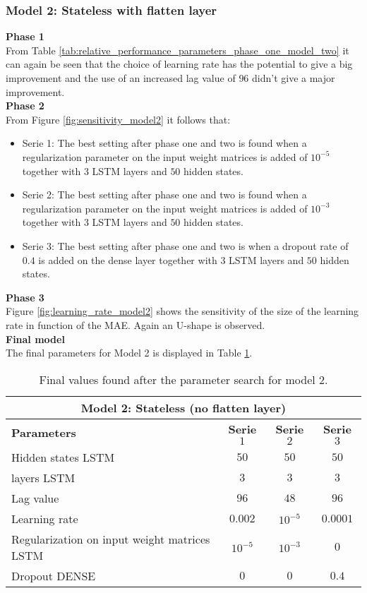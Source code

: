 \clearpage
\subsubsection{Model 2: Stateless with flatten layer}

\textbf{Phase 1}\\
From Table \ref{tab:relative_performance_parameters_phase_one_model_two} it can again be seen that the choice of learning rate has the potential to give a big improvement and the use of an increased lag value of $ 96 $ didn't give a major improvement.\\ 

\textbf{Phase 2}\\
From Figure \ref{fig:sensitivity_model2} it follows that:
\begin{itemize}
	\item Serie 1: The best setting after phase one and two is found when a regularization parameter on the input weight matrices is added of $ 10^{-5} $ together with $ 3 $ LSTM layers and $ 50 $ hidden states. 
	\item Serie 2: The best setting after phase one and two is found when a regularization parameter on the input weight matrices is added of $ 10^{-3} $ together with $ 3 $ LSTM layers and $ 50 $ hidden states.
	\item Serie 3: The best setting after phase one and two is when a dropout rate of $ 0.4 $ is added on the dense layer together with $ 3 $ LSTM layers and $ 50 $ hidden states.
\end{itemize}

\textbf{Phase 3}\\
Figure \ref{fig:learning_rate_model2} shows the sensitivity of the size of the learning rate in function of the MAE. Again an U-shape is observed.\\

\textbf{Final model}\\
The final parameters for Model 2 is displayed in Table \ref{tab:final_model2}.

\begin{table}[h]
	\centering
	\begin{tabular}{@{}l|ccc@{}} \toprule
		\multicolumn{4}{c}{Model 2: Stateless (no flatten layer)}\\\midrule\midrule
		\textbf{Parameters}	& \textbf{Serie $ 1 $} & \textbf{Serie $ 2 $} & \textbf{Serie $ 3 $}\\\midrule
		Hidden states LSTM & $50 $&$ 50 $  & $50 $\\
		layers LSTM & $3 $&$ 3 $  & $3$\\
		Lag value & $96 $&$ 48$  & $96$\\
		Learning rate & $0.002 $&$ 10^{-5}$  & $0.0001$\\\hline
		Regularization on input weight matrices LSTM   & $ 10^{-5} $ & $ 10^{-3} $ & $ 0 $\\
		Dropout DENSE   & $ 0 $ & $ 0 $ & $ 0.4 $\\\bottomrule
	\end{tabular}
	\caption{Final values found after the parameter search for model 2.}
	\label{tab:final_model2}
\end{table}

